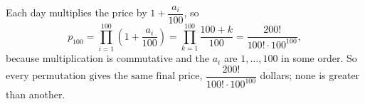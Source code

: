 Each day multiplies the price by $1+\dfrac{a_i}{100}$, so
\[p_{100}=\prod_{i=1}^{100}\left(1+\dfrac{a_i}{100}\right)=\prod_{k=1}^{100}\dfrac{100+k}{100}=\dfrac{200!}{100!\cdot100^{100}},\]
because multiplication is commutative and the $a_i$ are $1,\dots,100$ in some order. So $\boxed{\text{every permutation gives the same final price}}$, $\dfrac{200!}{100!\cdot100^{100}}$ dollars; none is greater than another.
